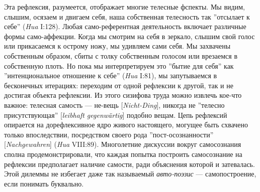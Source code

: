 \documentclass[12pt]{book}
\begin{document}
Эта рефлексия, разумеется, отображает многие телесные фспекты. Мы видим, слышим, осязаем и двигаем себя, наша собственная телесность так ''отсылает к себе'' (\textit{Hua} I:128). Любая само-референтная деятельность  включает различные формы само-аффекции. Когда мы смотрим на себя в зеркало, слышим свой голос или прикасаемся к острому ножу, мы удивляем сами себя. Мы захвачены собственным образом, сбиты с толку собственным голосом или врезаемся в собственную плоть. Но пока мы интерпретируем это ''бытие для себя'' как ''интенциональное отношение к себе'' (\textit{Hua} I:81), мы запутываемся в бесконечных итерациях: переходим от одной рефлексии к другой, так и не достигая объекта рефлексии. Из этого сизифова труда можно извлечь кое-что важное: телесная самость --- не-вещь [\textit{Nicht-Ding}], никогда не ''телесно присутствующая'' [\textit{leibhaft gegenwärtig}] подобно вещам. Цепь рефлексий опирается на дорефлексивное ядро живого настоящего, могущее быть схвачено только впоследствии, посредством своего рода ''пост-осознанности'' [\textit{Nachgewahren}] (\textit{Hua} VIII:89). Многолетние дискуссии вокруг самосознания сполна продемонстрировали, что каждая попытка построить самосознание на рефлексии предполагает наличие самости, ради объяснения которой и затевалась. Этой дилеммы не избегает даже так называемый \textit{авто-поэзис} --- самопостроение, если понимать буквально.
\end{document}
